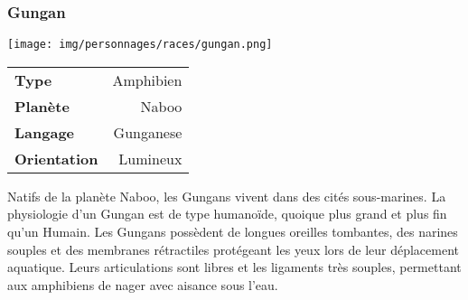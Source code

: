 \subsubsection{Gungan}
\begin{samepage}
	\vspace{-1\baselineskip}
	\texttt{[image: img/personnages/races/gungan.png]}
	\vspace{-12\baselineskip}

	\begin{flushright}
		\begin{tabular}{|l|r|}
			\textbf{Type} 			& Amphibien \\
		   	\textbf{Planète} 		& Naboo \\
		   	\textbf{Langage} 		& Gunganese \\
		   	\textbf{Orientation} 	& Lumineux \\
		\end{tabular}
	\end{flushright}

	\vspace{7\baselineskip}
\end{samepage}

Natifs de la planète Naboo, les Gungans vivent dans des cités sous-marines. La physiologie d’un Gungan est de type humanoïde, quoique plus grand et plus fin qu’un Humain. Les Gungans possèdent de longues oreilles tombantes, des narines souples et des membranes rétractiles protégeant les yeux lors de leur déplacement aquatique. Leurs articulations sont libres et les ligaments très souples, permettant aux amphibiens de nager avec aisance sous l’eau.

